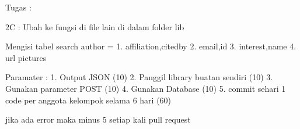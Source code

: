 Tugas :

2C : Ubah ke fungsi di file lain di dalam folder lib

Mengisi tabel search author =
1. affiliation,citedby
2. email,id
3. interest,name
4. url pictures

Paramater :
1. Output JSON (10)
2. Panggil library buatan sendiri (10)
3. Gunakan parameter POST (10)
4. Gunakan Database (10)
5. commit sehari 1 code per anggota kelompok selama 6 hari (60)

jika ada error maka minus 5 setiap kali pull request
